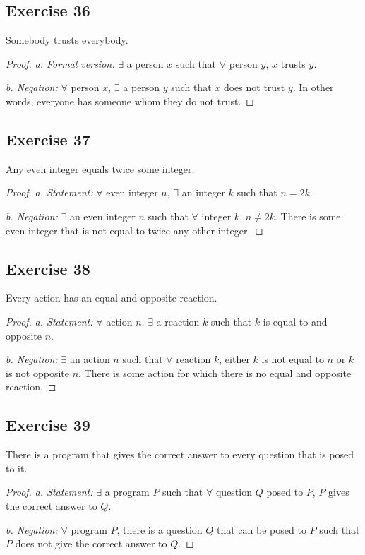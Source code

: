 \documentclass[14pt]{extarticle}
\newcommand{\fa}{\forall}
\newcommand{\te}{\exists}
\begin{document}
\subsection{Exercise 36}
Somebody trusts everybody.

\begin{proof}
{\it a. Formal version:} $\te$ a person $x$ such that $\fa$ person $y$, $x$ trusts $y$.

{\it b. Negation:} $\fa$ person $x$, $\te$ a person $y$ such that $x$ does not trust $y$. In other words, everyone has someone whom they do not trust.
\end{proof}

\subsection{Exercise 37}
Any even integer equals twice some integer.

\begin{proof}
{\it a. Statement:} $\fa$ even integer $n$, $\te$ an integer $k$ such that $n = 2k$.

{\it b. Negation:} $\te$ an even integer $n$ such that $\fa$ integer $k$, $n \neq 2k$. There is some even integer that is not equal to twice any other integer.
\end{proof}

\subsection{Exercise 38}
Every action has an equal and opposite reaction.

\begin{proof}
{\it a. Statement:} $\fa$ action $n$, $\te$ a reaction $k$ such that $k$ is equal to and opposite $n$.

{\it b. Negation:} $\te$ an action $n$ such that $\fa$ reaction $k$, either $k$ is not equal to $n$ or $k$ is not opposite $n$. There is some action for which there is no equal and opposite reaction.
\end{proof}

\subsection{Exercise 39}
There is a program that gives the correct answer to every question that is posed to it.

\begin{proof}
{\it a. Statement:} $\te$ a program $P$ such that $\fa$ question $Q$ posed to $P$, $P$ gives the correct answer to $Q$.

{\it b. Negation:} $\fa$ program $P$, there is a question $Q$ that can be posed to $P$ such that $P$ does not give the correct answer to $Q$.
\end{proof}
\end{document}
